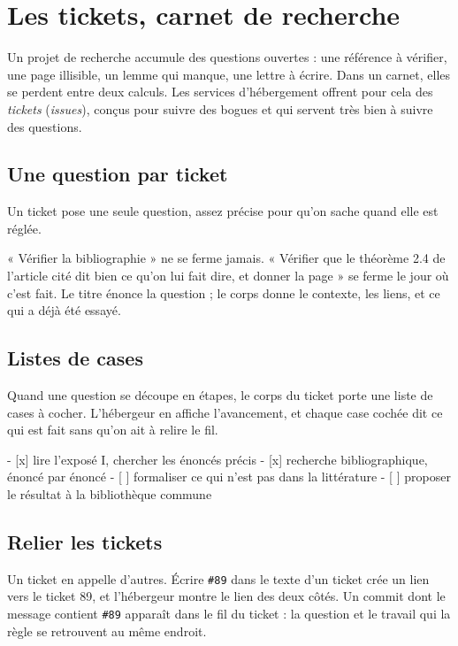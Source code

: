 \chapter{Les tickets, carnet de recherche}

Un projet de recherche accumule des questions ouvertes : une référence à vérifier, une page
illisible, un lemme qui manque, une lettre à écrire. Dans un carnet, elles se
perdent entre deux calculs. Les services d'hébergement offrent pour cela des
\emph{tickets} (\emph{issues}), conçus pour suivre des bogues et qui servent très bien à
suivre des questions.

\section{Une question par ticket}

\begin{regle}
Un ticket pose une seule question, assez précise pour qu'on sache quand elle est réglée.
\end{regle}

« Vérifier la bibliographie » ne se ferme jamais. « Vérifier que le théorème 2.4 de
l'article cité dit bien ce qu'on lui fait dire, et donner la page » se ferme le jour où
c'est fait. Le titre énonce la question ; le corps donne le contexte, les liens, et ce qui
a déjà été essayé.

\section{Listes de cases}

Quand une question se découpe en étapes, le corps du ticket porte une liste de cases à
cocher. L'hébergeur en affiche l'avancement, et chaque case cochée dit ce qui est fait sans
qu'on ait à relire le fil.

\begin{terminal}
- [x] lire l'exposé I, chercher les énoncés précis
- [x] recherche bibliographique, énoncé par énoncé
- [ ] formaliser ce qui n'est pas dans la littérature
- [ ] proposer le résultat à la bibliothèque commune
\end{terminal}

\section{Relier les tickets}

Un ticket en appelle d'autres. Écrire \texttt{\#89} dans le texte d'un ticket crée un lien
vers le ticket 89, et l'hébergeur montre le lien des deux côtés. Un commit dont le message
contient \texttt{\#89} apparaît dans le fil du ticket : la question et le travail qui la
règle se retrouvent au même endroit.

